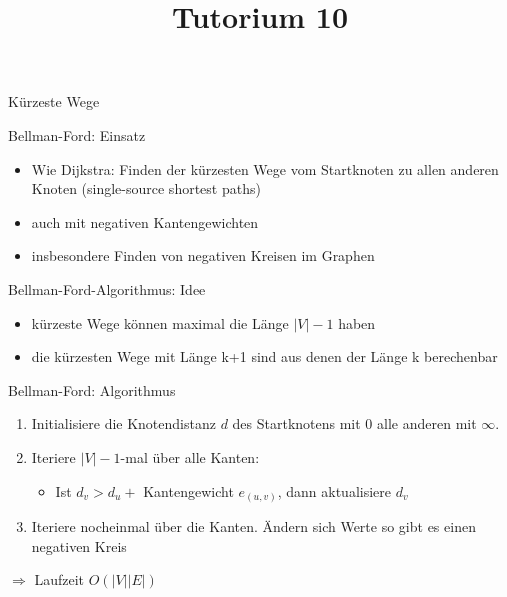 
\title[Algorithmen I SS 14]{Tutorium 10}

\usepackage{alltt}




\begin{frame}
  \maketitle
\end{frame}

\begin{frame}
	\begin{center}
		\Huge
		Kürzeste Wege
	\end{center}
\end{frame}

\begin{frame}{Bellman-Ford: Einsatz}
	\begin{itemize}
		\item Wie Dijkstra: Finden der kürzesten Wege vom Startknoten zu allen anderen Knoten (single-source shortest paths)
		\item auch mit negativen Kantengewichten
		\item insbesondere Finden von negativen Kreisen im Graphen
	\end{itemize}
\end{frame}

\begin{frame}{Bellman-Ford-Algorithmus: Idee}
	\begin{itemize}
		\item kürzeste Wege können maximal die Länge $|V|-1$ haben
		\item die kürzesten Wege mit Länge k+1 sind aus denen der Länge k berechenbar
	\end{itemize}
\end{frame}

\begin{frame}{Bellman-Ford: Algorithmus}
	\begin{enumerate}
		\item Initialisiere die Knotendistanz $d$ des Startknotens mit 0 alle anderen mit $\infty$.
		\item Iteriere $|V|-1$-mal über alle Kanten:
			\begin{itemize}
				\item Ist $d_v > d_u + $ Kantengewicht $e_{(u,v)}$, dann aktualisiere $d_v$
			\end{itemize}
		\item Iteriere nocheinmal über die Kanten. Ändern sich Werte so gibt es einen negativen Kreis
	\end{enumerate}
	$\Rightarrow$ Laufzeit $ O(|V||E|)$
\end{frame}


